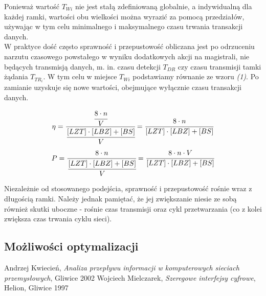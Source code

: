 \documentclass[a4paper,twoside]{article}
\begin{document}
	Ponieważ wartość $ T_{Wi} $ nie jest stałą zdefiniowaną globalnie, a indywidualną dla każdej ramki, wartości obu wielkości można wyrazić za pomocą przedziałów, używając w tym celu minimalnego i maksymalnego czasu trwania transakcji danych. \\
	W praktyce dość często sprawność i przepustowość obliczana jest po odrzuceniu narzutu czasowego powstałego w wyniku dodatkowych akcji na magistrali, nie będących transmisją danych, m. in. czasu detekcji $ T_{DR} $ czy czasu transmisji tamki żądania $ T_{TR_i} $. W tym celu w miejsce $ T_{Wi} $ podstawiamy równanie ze wzoru \textit{(1)}. Po zamianie uzyskuje się nowe wartości, obejmujące wyłącznie czasu transakcji danych.
	
	\begin{equation}
	\eta = \cfrac{\cfrac{8\cdot n}{V}}{\cfrac{[LZT] \cdot [LBZ]+[BS]}{V}} = \cfrac{8\cdot n}{[LZT] \cdot [LBZ]+[BS]}
	\end{equation}
	\begin{equation}
	P = \cfrac{8\cdot n}{\cfrac{[LZT] \cdot [LBZ]+[BS]}{V}} = \cfrac{8\cdot n \cdot V}{[LZT] \cdot [LBZ]+[BS]}
	\end{equation}
	
	Niezależnie od stosowanego podejścia, sprawność i przepustowość rośnie wraz z długością ramki. Należy jednak pamiętać, że jej zwiększanie niesie ze sobą również skutki uboczne - rośnie czas transmisji oraz cykl przetwarzania (co z kolei zwiększa czas trwania cyklu sieci). \\
	
	\subsection{Możliwości optymalizacji}
	
	
	


\newpage
\begin{thebibliography}{2}
	 Andrzej Kwiecień, \textit{Analiza przepływu informacji w komputerowych sieciach przemysłowych}, Gliwice 2002
	 Wojciech Mielczarek, \textit{Szeregowe interfejsy cyfrowe}, Helion, Gliwice 1997
\end{thebibliography}
\end{document}
